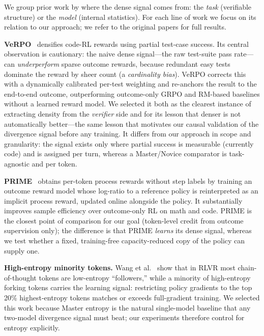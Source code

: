 \documentclass[times, 10pt,twocolumn]{article}
\begin{document}

We group prior work by where the dense signal comes from: the \emph{task}
(verifiable structure) or the \emph{model} (internal statistics). For each line
of work we focus on its relation to our approach; we refer to the original
papers for full results.


\textbf{VeRPO}~\cite{wang2026verpo} densifies code-RL rewards using partial
test-case success. Its central observation is cautionary: the naive dense
signal---the raw test-suite pass rate---can \emph{underperform} sparse outcome
rewards, because redundant easy tests dominate the reward by sheer count (a
\emph{cardinality bias}). VeRPO corrects this with a dynamically calibrated
per-test weighting and re-anchors the result to the end-to-end outcome,
outperforming outcome-only GRPO and RM-based baselines without a learned
reward model. We selected it both as the clearest instance of extracting
density from the \emph{verifier} side and for its lesson that denser is not
automatically better---the same lesson that motivates our causal validation of
the divergence signal before any training. It differs from our approach in
scope and granularity: the signal exists only where partial success is
measurable (currently code) and is assigned per turn, whereas a Master/Novice
comparator is task-agnostic and per token.

\textbf{PRIME}~\cite{cui2025prime} obtains per-token process rewards without
step labels by training an outcome reward model whose log-ratio to a reference
policy is reinterpreted as an implicit process reward, updated online alongside
the policy. It substantially improves sample efficiency over outcome-only RL on
math and code. PRIME is the closest point of comparison for our goal
(token-level credit from outcome supervision only); the difference is that
PRIME \emph{learns} its dense signal, whereas we test whether a fixed,
training-free capacity-reduced copy of the policy can supply one.


\textbf{High-entropy minority tokens.} Wang et
al.~\cite{wang2025forking} show that in RLVR most chain-of-thought tokens are
low-entropy ``followers,'' while a minority of high-entropy forking tokens
carries the learning signal: restricting policy gradients to the top 20\%
highest-entropy tokens matches or exceeds full-gradient training. We selected
this work because Master entropy is the natural single-model baseline that any
two-model divergence signal must beat; our experiments therefore control for
entropy explicitly.
\end{document}
